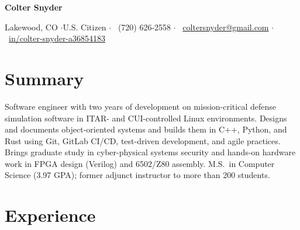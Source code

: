 \documentclass[letterpaper,10pt]{article}
\begin{document}
\begin{center}
  {\Huge\bfseries Colter Snyder}\par\vspace{4pt}
  \small
  Lakewood, CO \enspace$\cdot$\enspace U.S. Citizen \enspace$\cdot$\enspace
  \faPhone*\ (720) 626-2558 \enspace$\cdot$\enspace
  \faEnvelope\ \href{mailto:coltersnyder@gmail.com}{coltersnyder@gmail.com} \enspace$\cdot$\enspace
  \faLinkedin\ \href{https://www.linkedin.com/in/colter-snyder-a36854183/}{in/colter-snyder-a36854183}
\end{center}

\section{Summary}
Software engineer with two years of development on mission-critical defense simulation software in
ITAR- and CUI-controlled Linux environments. Designs and documents object-oriented systems and builds them
in C++, Python, and Rust using Git, GitLab CI/CD, test-driven development, and agile practices. Brings
graduate study in cyber-physical systems security and hands-on hardware work in FPGA design (Verilog) and
6502/Z80 assembly. M.S.\ in Computer Science (3.97 GPA); former adjunct instructor to more than 200 students.

\section{Experience}
\end{document}
